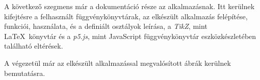  A következő szegmens már a dokumentáció része az alkalmazásnak. Itt kerülnek kifejtésre a felhasznált függvénykönyvtárak, az elkészült alkalmazás felépítése, funkciói, használata, és a definiált osztályok leírása, a \textit{TikZ}, mint \LaTeX\ könyvtár és a \textit{p5.js}, mint JavaScript függvénykönyvtár eszközkészletében található eltérések. 
 
 A végezetül már az elkészült alkalmazással megvalósított ábrák kerülnek bemutatásra.
